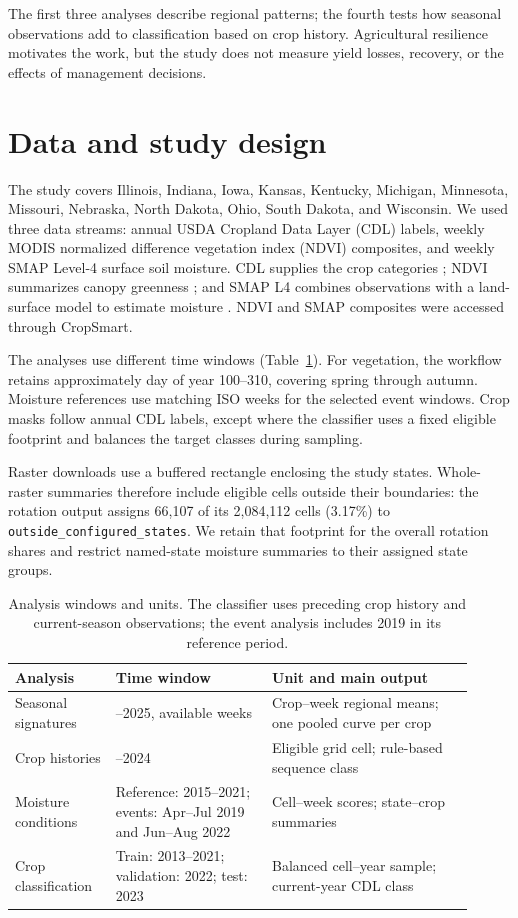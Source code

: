 \documentclass[11pt,letterpaper]{article}
\begin{document}
The first three analyses describe regional patterns; the fourth tests how seasonal observations add to classification based on crop history. Agricultural resilience motivates the work, but the study does not measure yield losses, recovery, or the effects of management decisions.

\section{Data and study design}
\label{sec:data}
The study covers Illinois, Indiana, Iowa, Kansas, Kentucky, Michigan, Minnesota, Missouri, Nebraska, North Dakota, Ohio, South Dakota, and Wisconsin. We used three data streams: annual USDA Cropland Data Layer (CDL) labels, weekly MODIS normalized difference vegetation index (NDVI) composites, and weekly SMAP Level-4 surface soil moisture. CDL supplies the crop categories \citep{cdl_cropscape}; NDVI summarizes canopy greenness \citep{modis_vi_userguide}; and SMAP L4 combines observations with a land-surface model to estimate moisture \citep{reichle2017smap}. NDVI and SMAP composites were accessed through CropSmart.

The analyses use different time windows (Table~\ref{tab:design}). For vegetation, the workflow retains approximately day of year 100--310, covering spring through autumn. Moisture references use matching ISO weeks for the selected event windows. Crop masks follow annual CDL labels, except where the classifier uses a fixed eligible footprint and balances the target classes during sampling.

Raster downloads use a buffered rectangle enclosing the study states. Whole-raster summaries therefore include eligible cells outside their boundaries: the rotation output assigns 66,107 of its 2,084,112 cells (3.17\%) to \texttt{outside\_configured\_states}. We retain that footprint for the overall rotation shares and restrict named-state moisture summaries to their assigned state groups.

\begin{table}[htbp]
\centering\small
\begin{tabular}{>{\raggedright\arraybackslash}p{0.20\linewidth}>{\raggedright\arraybackslash}p{0.31\linewidth}>{\raggedright\arraybackslash}p{0.40\linewidth}}
\toprule
Analysis & Time window & Unit and main output \\
\midrule
Seasonal signatures & 2008--2025, available weeks & Crop--week regional means; one pooled curve per crop \\
Crop histories & 2015--2024 & Eligible grid cell; rule-based sequence class \\
Moisture conditions & Reference: 2015--2021; events: Apr--Jul 2019 and Jun--Aug 2022 & Cell--week scores; state--crop summaries \\
Crop classification & Train: 2013--2021; validation: 2022; test: 2023 & Balanced cell--year sample; current-year CDL class \\
\bottomrule
\end{tabular}
\caption{Analysis windows and units. The classifier uses preceding crop history and current-season observations; the event analysis includes 2019 in its reference period.}
\label{tab:design}
\end{table}
\end{document}
